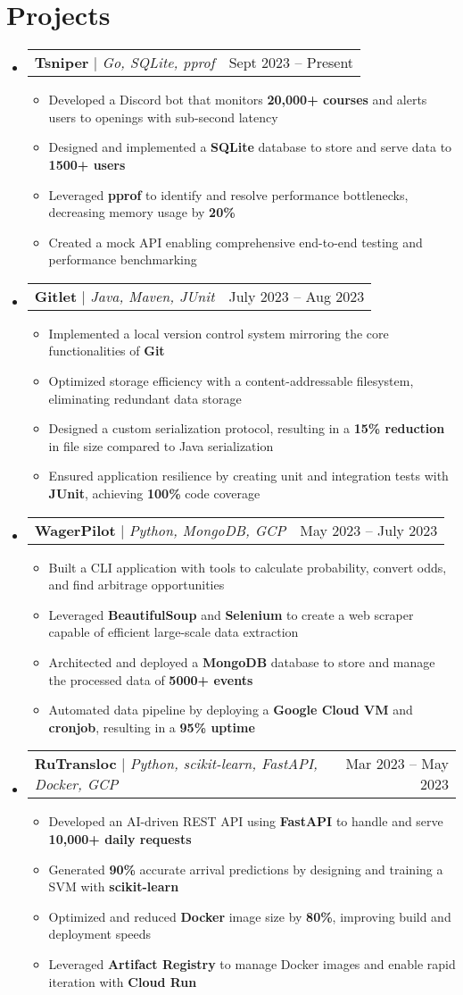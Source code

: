 \documentclass[letterpaper,11pt]{article}
\makeatletter
\newcommand{\resumeItem}[1]{
  \item\small{
    {#1 \vspace{-2pt}}
  }
}
\newcommand{\resumeProjectHeading}[2]{
    \item
    \begin{tabular*}{0.97\textwidth}{l@{\extracolsep{\fill}}r}
      \small#1 & #2 \\
    \end{tabular*}\vspace{-7pt}
}
\newcommand{\resumeSubHeadingListStart}{\begin{itemize}[leftmargin=0.15in, label={}]}
\newcommand{\resumeSubHeadingListEnd}{\end{itemize}}
\newcommand{\resumeItemListStart}{\begin{itemize}}
\newcommand{\resumeItemListEnd}{\end{itemize}\vspace{-3pt}}
\makeatother
\begin{document}
\section{Projects}
    \resumeSubHeadingListStart
      \resumeProjectHeading
          {\textbf{Tsniper} $|$ \emph{Go, SQLite, pprof}}{Sept 2023 -- Present}
          \resumeItemListStart
            \resumeItem{Developed a Discord bot that monitors \textbf{20,000+ courses} and alerts users to openings with sub-second latency}
            \resumeItem{Designed and implemented a \textbf{SQLite} database to store and serve data to \textbf{1500+ users}}
            \resumeItem{Leveraged \textbf{pprof} to identify and resolve performance bottlenecks, decreasing memory usage by \textbf{20\%}}
            \resumeItem{Created a mock API enabling comprehensive end-to-end testing and performance benchmarking}
          \resumeItemListEnd
      \resumeProjectHeading
          {\textbf{Gitlet} $|$ \emph{Java, Maven, JUnit}}{July 2023 -- Aug 2023}
      \resumeItemListStart  
            \resumeItem{Implemented a local version control system mirroring the core functionalities of \textbf{Git}}
            \resumeItem{Optimized storage efficiency with a content-addressable filesystem, eliminating redundant data storage}
            \resumeItem{Designed a custom serialization protocol, resulting in a \textbf{15\% reduction} in file size compared to Java serialization}
            \resumeItem{Ensured application resilience by creating unit and integration tests with \textbf{JUnit}, achieving \textbf{100\%} code coverage}
          \resumeItemListEnd
      \resumeProjectHeading
          {\textbf{WagerPilot} $|$ \emph{Python, MongoDB, GCP}}{May 2023 -- July 2023}
          \resumeItemListStart
            \resumeItem{Built a CLI application with tools to calculate probability, convert odds, and find arbitrage opportunities}
            \resumeItem{Leveraged \textbf{BeautifulSoup} and \textbf{Selenium} to create a web scraper capable of efficient large-scale data extraction}
            \resumeItem{Architected and deployed a \textbf{MongoDB} database to store and manage the processed data of \textbf{5000+ events}}
            \resumeItem{Automated data pipeline by deploying a \textbf{Google Cloud VM} and \textbf{cronjob}, resulting in a \textbf{95\% uptime}}
          \resumeItemListEnd
      \resumeProjectHeading
          {\textbf{RuTransloc} $|$ \emph{Python, scikit-learn, FastAPI, Docker, GCP}}{Mar 2023 -- May 2023}
          \resumeItemListStart
            \resumeItem{Developed an AI-driven REST API using \textbf{FastAPI} to handle and serve \textbf{10,000+ daily requests}}
            \resumeItem{Generated \textbf{90\%} accurate arrival predictions by designing and training a SVM with \textbf{scikit-learn}}
            \resumeItem{Optimized and reduced \textbf{Docker} image size by \textbf{80\%}, improving build and deployment speeds}
            \resumeItem{Leveraged \textbf{Artifact Registry} to manage Docker images and enable rapid iteration with \textbf{Cloud Run}}
          \resumeItemListEnd
    \resumeSubHeadingListEnd
\end{document}
